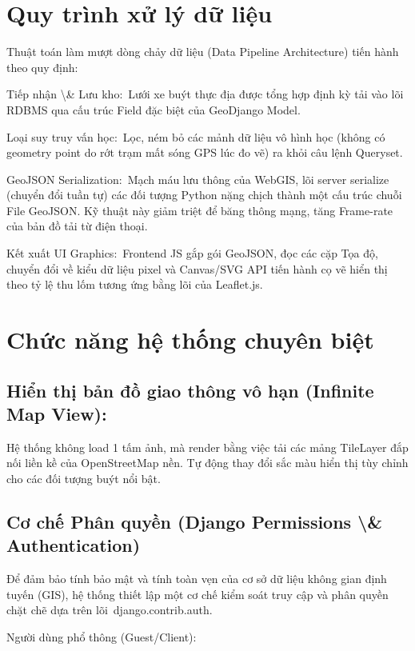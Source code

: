 \documentclass[13pt,a4paper]{report}
\begin{document}
\section{Quy trình xử lý dữ liệu}

Thuật toán làm mượt dòng chảy dữ liệu (Data Pipeline Architecture) tiến hành theo quy định:

Tiếp nhận \textbackslash{}& Lưu kho: Lưới xe buýt thực địa được tổng hợp định kỳ tải vào lõi RDBMS qua cấu trúc Field đặc biệt của GeoDjango Model.

Loại suy truy vấn học: Lọc, ném bỏ các mảnh dữ liệu vô hình học (không có geometry point do rớt trạm mất sóng GPS lúc đo vẽ) ra khỏi câu lệnh Queryset.

GeoJSON Serialization: Mạch máu lưu thông của WebGIS, lõi server serialize (chuyển đổi tuần tự) các đối tượng Python nặng chịch thành một cấu trúc chuỗi File GeoJSON. Kỹ thuật này giảm triệt để băng thông mạng, tăng Frame-rate của bản đồ tải từ điện thoại.

Kết xuất UI Graphics: Frontend JS gắp gói GeoJSON, đọc các cặp Tọa độ, chuyển đổi về kiểu dữ liệu pixel và Canvas/SVG API tiến hành cọ vẽ hiển thị theo tỷ lệ thu lốm tương ứng bằng lõi của Leaflet.js.

\section{Chức năng hệ thống chuyên biệt}

\subsection{Hiển thị bản đồ giao thông vô hạn (Infinite Map View):}

Hệ thống không load 1 tấm ảnh, mà render bằng việc tải các mảng TileLayer đắp nối liền kề của OpenStreetMap nền. Tự động thay đổi sắc màu hiển thị tùy chỉnh cho các đối tượng buýt nổi bật.

\subsection{Cơ chế Phân quyền (Django Permissions \textbackslash{}& Authentication)}

Để đảm bảo tính bảo mật và tính toàn vẹn của cơ sở dữ liệu không gian định tuyến (GIS), hệ thống thiết lập một cơ chế kiểm soát truy cập và phân quyền chặt chẽ dựa trên lõi django.contrib.auth.

Người dùng phổ thông (Guest/Client):
\end{document}
